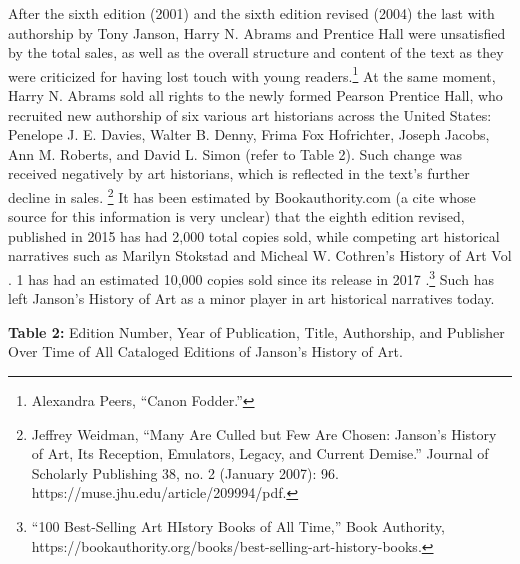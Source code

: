 \documentclass[
  letterpaper,
  DIV=11,
  numbers=noendperiod]{scrreprt}
\begin{document}
After the sixth edition (2001) and the sixth edition revised (2004) the
last with authorship by Tony Janson, Harry N. Abrams and Prentice Hall
were unsatisfied by the total sales, as well as the overall structure
and content of the text as they were criticized for having lost touch
with young readers.\footnote{Alexandra Peers, ``Canon Fodder.''} At the
same moment, Harry N. Abrams sold all rights to the newly formed Pearson
Prentice Hall, who recruited new authorship of six various art
historians across the United States: Penelope J. E. Davies, Walter B.
Denny, Frima Fox Hofrichter, Joseph Jacobs, Ann M. Roberts, and David L.
Simon (refer to Table 2). Such change was received negatively by art
historians, which is reflected in the text's further decline in sales.
\footnote{Jeffrey Weidman, ``Many Are Culled but Few Are Chosen:
  Janson's History of Art, Its Reception, Emulators, Legacy, and Current
  Demise.'' Journal of Scholarly Publishing 38, no. 2 (January 2007):
  96. https://muse.jhu.edu/article/209994/pdf.} It has been estimated by
Bookauthority.com (a cite whose source for this information is very
unclear) that the eighth edition revised, published in 2015 has had
2,000 total copies sold, while competing art historical narratives such
as Marilyn Stokstad and Micheal W. Cothren's History of Art Vol . 1 has
had an estimated 10,000 copies sold since its release in 2017
.\footnote{``100 Best-Selling Art HIstory Books of All Time,'' Book
  Authority,
  https://bookauthority.org/books/best-selling-art-history-books.} Such
has left Janson's History of Art as a minor player in art historical
narratives today.

\textbf{Table 2:} Edition Number, Year of Publication, Title,
Authorship, and Publisher Over Time of All Cataloged Editions of
Janson's History of Art.
\end{document}
